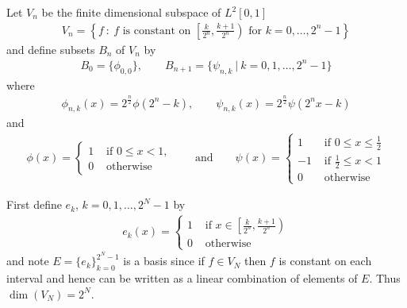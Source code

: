 \documentclass{article} %
\theoremstyle{plain}
\numberwithin{equation}{section} %
\numberwithin{figure}{section} %
\numberwithin{table}{section} %
\begin{document}
Let $V_n$ be the finite dimensional subspace of $L^2[0,1]$
\begin{align*}
    V_n = \left\{f\ :\ f \text{ is constant on } \left[\frac{k}{2^n}, \frac{k+1}{2^n}\right) \text{ for } k = 0, \dots, 2^n - 1\right\}
\end{align*}
and define subsets $B_n$ of $V_n$ by
\begin{align*}
    B_0 = \{\phi_{0,0}\},\qquad B_{n+1} = \{\psi_{n,k}\ |\ k = 0, 1, \dots, 2^n - 1\}
\end{align*}
where
\begin{align*}
    \phi_{n,k}(x) = 2^{\frac{n}{2}}\phi(2^n - k), \qquad \psi_{n,k}(x) = 2^{\frac{n}{2}}\psi(2^n x - k)
\end{align*}
and
\begin{align*}
    \phi(x) = \begin{cases}
        1 & \text{ if } 0 \leq x < 1, \\
        0 & \text{ otherwise}
    \end{cases} \qquad \text{and} \qquad \psi(x) = \begin{cases}
        1 & \text{ if } 0 \leq x \leq \frac{1}{2} \\
        -1 & \text{ if } \frac{1}{2} \leq x < 1 \\
        0 & \text{ otherwise}
    \end{cases}
\end{align*}

First define $e_k$, $k = 0, 1, \dots, 2^N - 1$ by
\begin{align*}
    e_k(x) = \begin{cases}
        1 & \text{ if } x \in \left[\frac{k}{2^n}, \frac{k+1}{2^n}\right) \\
        0 & \text{ otherwise }
    \end{cases}
\end{align*}
and note $E = \big\{e_k\big\}_{k=0}^{2^N-1}$ is a basis since if $f \in V_N$ then $f$ is constant on each interval and hence can be written as a linear combination of elements of $E$.  Thus $\dim(V_N) = 2^N$.
\end{document}
